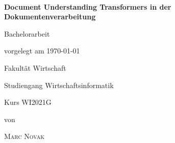 \newcommand{\typMeinerArbeit}{Bachelorarbeit}

\newcommand{\themaMeinerArbeit}{Document Understanding Transformers in der Dokumentenverarbeitung}

\newcommand{\meinName}{Marc Novak}

\thispagestyle{empty}

\begin{spacing}{1}
  \begin{center}
    ~\vspace{0mm}

    {\sffamily
      \LARGE
      \textbf{Document Understanding Transformers in der Dokumentenverarbeitung}

      \bigskip
      \textbf{}
    }


    \vspace{15mm}

    {\Large \typMeinerArbeit}

    \vspace{1cm}

    vorgelegt am \today

    \vspace{15mm}

    Fakultät Wirtschaft
    \medskip

    Studiengang Wirtschaftsinformatik
    \medskip

    Kurs WI2021G

    \vspace{10mm}

    von

    \vspace{10mm}

    {\large\textsc{\meinName}}

    \vspace{10mm}
  \end{center}


\end{spacing}
